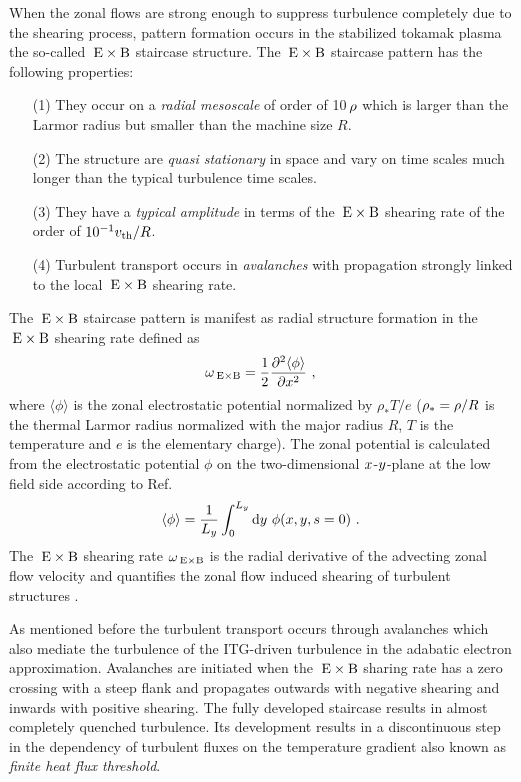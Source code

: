 When the zonal flows are strong enough to suppress turbulence completely due to the shearing process, pattern formation occurs in the stabilized tokamak plasma the so-called $\mathrm{\:E}\times\mathrm{B}$ staircase structure. The $\mathrm{\:E}\times\mathrm{B}$ staircase pattern has the following properties:
\begin{enumerate}
	\item[(1)] They occur on a \textit{radial mesoscale} of order of 10\,$\rho$ which is larger than the Larmor radius but smaller than the machine size $R$.
	\item[(2)] The structure are \textit{quasi stationary} in space and vary on time scales much longer than the typical turbulence time scales.
	\item[(3)] They have a \textit{typical amplitude} in terms of the $\mathrm{\:E}\times\mathrm{B}$ shearing rate of the order of $10^{-1} v_{\mathrm{th}}/R$.
	\item[(4)] Turbulent transport occurs in \textit{avalanches} with propagation strongly linked to the local $\mathrm{\:E}\times\mathrm{B}$ shearing rate. \cite{McMillan2009}
\end{enumerate} \bigskip

The $\mathrm{\:E}\times\mathrm{B}$ staircase pattern is manifest as radial structure formation in the $\mathrm{\:E}\times\mathrm{B}$ shearing rate defined as\cite{Rath2016, Pueschel2008, Peeters2016}
\begin{equation}
	\omega_{\mathrm{\:E \times B}} = \frac{1}{2} \frac{\partial^2 \langle \phi \rangle}{\partial x^2}~,
	\label{eq:shearingrate}
\end{equation}
where $\langle \phi \rangle$ is the zonal electrostatic potential normalized by $\rho_\ast T/e$ ($\rho_\ast = \rho/R$ is the thermal Larmor radius normalized with the major radius $R$, $T$ is the temperature and $e$ is the elementary charge).
The zonal potential is calculated from the electrostatic potential $\phi$ on the two-dimensional $x$-$y$-plane at the low field side according to Ref. 
\begin{equation}
\langle \phi \rangle = \frac{1}{L_y} \int_0^{L_y} \mathrm{d}y ~ \phi(x,y,s=0)~.
\end{equation}
The $\mathrm{\:E}\times\mathrm{B}$ shearing rate $\omega_{\mathrm{\:E \times B}}$ is the radial derivative of the advecting zonal flow velocity \cite{Hahm1995, Waltz1998} and quantifies the zonal flow induced shearing of turbulent structures \cite{Biglari1990, Hahm1995, Burnell1997}. \\ \bigskip

As mentioned before the turbulent transport occurs through avalanches which also mediate the turbulence of the ITG-driven turbulence in the adabatic electron approximation. Avalanches are initiated when the $\mathrm{\:E}\times\mathrm{B}$ sharing rate has a zero crossing with a steep flank and propagates outwards with negative shearing and inwards with positive shearing. \cite{Idomura2009,McMillan2009} The fully developed staircase results in almost completely quenched turbulence. Its development results in a discontinuous step in the dependency of turbulent fluxes on the temperature gradient also known as \textit{finite heat flux threshold}. \cite{Peeters2016,Weikl2017}